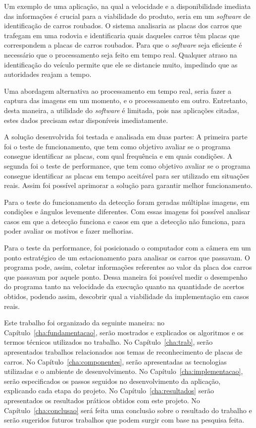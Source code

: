Um exemplo de uma aplicação, na qual a velocidade e a disponibilidade imediata das informações é crucial para a viabilidade do produto, seria em um \emph{software} de identificação de carros roubados. O sistema analisaria as placas dos carros que trafegam em uma rodovia e identificaria quais daqueles carros têm placas que correspondem a placas de carros roubados. Para que o \emph{software} seja eficiente é necessário que o processamento seja feito em tempo real. Qualquer atraso na identificação do veículo permite que ele se distancie muito, impedindo que as autoridades reajam a tempo.

Uma abordagem alternativa ao processamento em tempo real, seria fazer a captura das imagens em um momento, e o processamento em outro. Entretanto, desta maneira, a utilidade do \emph{software} é limitada, pois nas aplicações citadas, estes dados precisam estar disponíveis imediatamente.

A solução desenvolvida foi testada e analisada em duas partes: A primeira parte foi o teste de funcionamento, que tem como objetivo avaliar se o programa consegue identificar as placas, com qual frequência e em quais condições. A segunda foi o teste de performance, que tem como objetivo avaliar se o programa consegue identificar as placas em tempo aceitável para ser utilizado em situações reais. Assim foi possível aprimorar a solução para garantir melhor funcionamento.

Para o teste do funcionamento da detecção foram geradas múltiplas imagens, em condições e ângulos levemente diferentes. Com essas imagens foi possível analisar casos em que a detecção funciona e casos em que a detecção não funciona, para poder avaliar os motivos e fazer melhorias.

Para o teste da performance, foi posicionado o computador com a câmera em um ponto estratégico de um estacionamento para analisar os carros que passavam. O programa pode, assim, coletar informações referentes ao valor da placa dos carros que passavam por aquele ponto. Dessa maneira foi possível medir o desempenho do programa tanto na velocidade da execução quanto na quantidade de acertos obtidos, podendo assim, descobrir qual a viabilidade da implementação em casos reais.

Este trabalho foi organizado da seguinte maneira: no Capítulo~\ref{cha:fundamentacao}, serão mostrados e explicados os algoritmos e os termos técnicos utilizados no trabalho. No Capítulo~\ref{cha:trab},
serão apresentados trabalhos relacionados aos temas de reconhecimento de placas de carros. No Capítulo~\ref{cha:componentes}, serão apresentadas as tecnologias utilizadas e o ambiente de desenvolvimento. No Capítulo~\ref{cha:implementacao}, serão especificados os passos seguidos no desenvolvimento da aplicação, explicando cada etapa do projeto. No Capítulo~\ref{cha:resultados} serão apresentados os resultados práticos obtidos com este projeto. No Capítulo~\ref{cha:conclusao} será feita uma conclusão sobre o resultado do trabalho e serão sugeridos futuros trabalhos que podem surgir com base na pesquisa feita.
